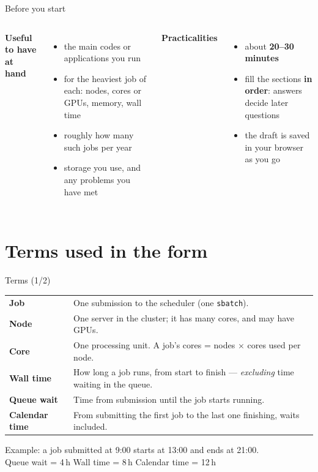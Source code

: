 \documentclass[aspectratio=169,11pt]{beamer}
\newcommand{\term}[1]{\textbf{\textcolor{iiser}{#1}}}
\begin{document}
\begin{frame}{Before you start}
  \begin{columns}[T]
    \textbf{Useful to have at hand}
    \begin{itemize}
      \item the main codes or applications you run
      \item for the heaviest job of each: nodes, cores or GPUs, memory, wall time
      \item roughly how many such jobs per year
      \item storage you use, and any problems you have met
    \end{itemize}
    \textbf{Practicalities}
    \begin{itemize}
      \item \faClock[regular]\; about \textbf{20--30 minutes}
      \item fill the sections \textbf{in order}: answers decide later questions
      \item the draft is saved in your browser as you go
    \end{itemize}
  \end{columns}
\end{frame}

\section{Terms used in the form}

\begin{frame}{Terms (1/2)}
  \small
  \begin{tabularx}{\textwidth}{@{}l X@{}}
    \toprule
    \term{Job} & One submission to the scheduler (one \texttt{sbatch}). \\
    \term{Node} & One server in the cluster; it has many cores, and may have GPUs. \\
    \term{Core} & One processing unit. A job's cores = nodes $\times$ cores used per node. \\
    \term{Wall time} & How long a job runs, from start to finish --- \emph{excluding} time waiting in the queue. \\
    \term{Queue wait} & Time from submission until the job starts running. \\
    \term{Calendar time} & From submitting the first job to the last one finishing, waits included. \\
    \bottomrule
  \end{tabularx}
  \vfill
  \normalsize
  Example: a job submitted at 9:00 starts at 13:00 and ends at 21:00.\\
  Queue wait = 4\,h \quad Wall time = 8\,h \quad Calendar time = 12\,h
\end{frame}
\end{document}

